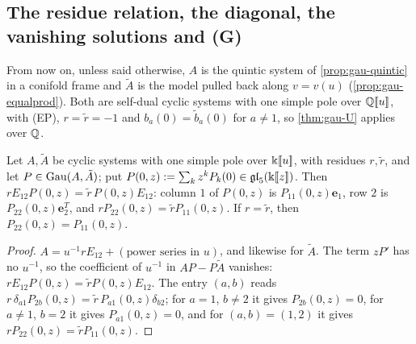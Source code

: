 
\subsection{The residue relation, the diagonal, the vanishing solutions and (G)}
\label{sec:gau-van}

From now on, unless said otherwise, $A$ is the quintic system of \cref{prop:gau-quintic} in a conifold frame and $\tilde A$ is the model pulled back along $v=v(u)$ (\cref{prop:gau-equalprod}). Both are self-dual cyclic systems with one simple pole over $\mathbb{Q}[\![ u ]\!]$, with (EP), $r=\tilde r=-1$ and $b_a(0)=\tilde b_a(0)$ for $a\neq1$, so \cref{thm:gau-U} applies over $\mathbb{Q}$.

\begin{lem}
\label{lem:gau-R1}
Let $A,\tilde A$ be cyclic systems with one simple pole over $\Bbbk[\![ u ]\!]$, with residues $r,\tilde r$, and let $P\in\operatorname{Gau}(A,\tilde A)$; put $P(0,z):=\sum_kz^kP_k(0)\in\mathfrak{gl}_5(\Bbbk[\![ z ]\!])$. Then $rE_{12}P(0,z)=\tilde r\,P(0,z)E_{12}$: column $1$ of $P(0,z)$ is $P_{11}(0,z)\mathbf e_1$, row $2$ is $P_{22}(0,z)\mathbf e_2^T$, and $rP_{22}(0,z)=\tilde rP_{11}(0,z)$. If $r=\tilde r$, then $P_{22}(0,z)=P_{11}(0,z)$.
\end{lem}

\begin{proof}
$A=u^{-1}rE_{12}+(\text{power series in }u)$, and likewise for $\tilde A$. The term $zP'$ has no $u^{-1}$, so the coefficient of $u^{-1}$ in $AP-P\tilde A$ vanishes: $rE_{12}P(0,z)=\tilde rP(0,z)E_{12}$. The entry $(a,b)$ reads $r\,\delta_{a1}P_{2b}(0,z)=\tilde r\,P_{a1}(0,z)\delta_{b2}$; for $a=1$, $b\neq2$ it gives $P_{2b}(0,z)=0$, for $a\neq1$, $b=2$ it gives $P_{a1}(0,z)=0$, and for $(a,b)=(1,2)$ it gives $rP_{22}(0,z)=\tilde rP_{11}(0,z)$.
\end{proof}

